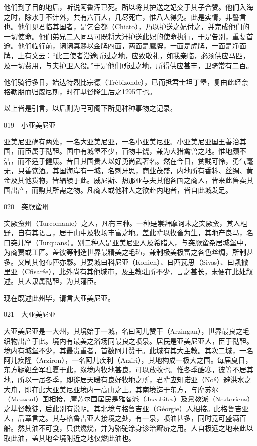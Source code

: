 \documentclass[12pt,UTF8]{ctexbook}
\begin{document}
他们到了目的地后，听说阿鲁浑已死。所以将其护送之妃交于其子合赞。他们入海之时，除水手不计外，共有六百人，几尽死亡，惟八人得免。此是实情，非誓言也。他们见君临其国者，是乞合都（Chiato），乃以护送之妃付之，并完成他们的一切使命。他们弟兄二人同马可既将大汗护送此妃的使命执行，于是告别，重复首途。他们临行前，阔阔真赐以金牌四面，两面是鹰牌，一面是虎牌，一面是净面牌，上有文云：“此三使者沿途所过之地，应致敬礼，如我亲临，必须供应马匹，及一切费用，与夫护卫人役。”于是他们所过之地，所得供应甚丰，卫骑常有二百。

他们骑行多日，始达特烈比宗德（Trébizonde），已而抵君士坦丁堡，复由此经奈格勒朋而归威尼斯，时在基督降生后之1295年也。

以上皆是引言，以后则为马可阁下所见种种事物之记录。





019　小亚美尼亚

亚美尼亚确有两处，一名大亚美尼亚，一名小亚美尼亚。小亚美尼亚国王善治其国，而臣属于鞑靼。国中有城堡不少，百物丰饶，兼为大猎禽兽之地。惟地颇不洁，而不适于健康。昔日其国贵人以好勇尚武著名。然在今日，贫贱可怜，勇气毫无，只善饮酒。其国海岸有一城，名剌牙思，商业茂盛，内地所有香料、丝绸、黄金及其他货物，皆辐辏于此。威尼斯、热那亚与夫其他各国之商人，皆来此售卖其国出产，而购其所需之物。凡商人或他种人之欲赴内地者，皆自此城发足。





020　突厥蛮州

突厥蛮州（Turcomanie）之人，凡有三种。一种是崇拜摩诃末之突厥蛮，其人粗野，自有其语言，居于山中及牧场丰富之地。盖此辈以牧畜为生，其地产良马，名曰突儿罕（Turquans）。别二种人是亚美尼亚人及希腊人，与突厥蛮杂居城堡中，为商贾或工匠。盖彼等制造世界最精美之毛毡，兼制极美极富之各色丝绸，所制甚多。又制其他布匹亦夥。其要城曰科尼亚（Konieh）、曰西瓦思（Sivas）、曰凯撒里亚（Cfisarée），此外尚有其他城市，及主教驻所不少，言之甚长，未便在此处叙述。其人隶属鞑靼，为其藩臣。

现在既述此州毕，请言大亚美尼亚。

021　大亚美尼亚

大亚美尼亚是一大州，其境始于一城，名曰阿儿赞干（Arzingan），世界最良之毛织物出产于此。境内有最美之浴场同最良之喷泉。居民是亚美尼亚人，臣于鞑靼。境内有城堡不少，其最贵重者，首数阿儿赞干。此城有其大主教。其次二城，一名阿儿疾隆（Arziron），一名阿儿疾利（Arziri），其地构成一极大之国。每届夏日，东方鞑靼全军驻夏于此，缘境内牧地甚良，可以放牧也。惟冬季酷寒，彼等不居其地，所以一届冬季，即徙居天暖有良好牧地之所，君辈应知诺亚（Noé）避洪水之大舟，即在此大亚美尼亚境内一高山之上。其南境迄于东方，与摩苏尔（Mossoul）国相接，摩苏尔国居民是雅各派（Jacobites）及景教派（Nestoriens）之基督教徒，后此别有说明。其北境与格鲁吉亚（Géorgie）人相接。此格鲁吉亚人，后章言之。其与格鲁吉亚人接境之处，有一泉，喷油甚多，同时竟可盛满百船。然其油不可食，只供燃烧，并为骆驼涂身诊治癣疥之用。人自极远之地来此以取此油，盖其地全境附近之地仅燃此油也。
\end{document}
